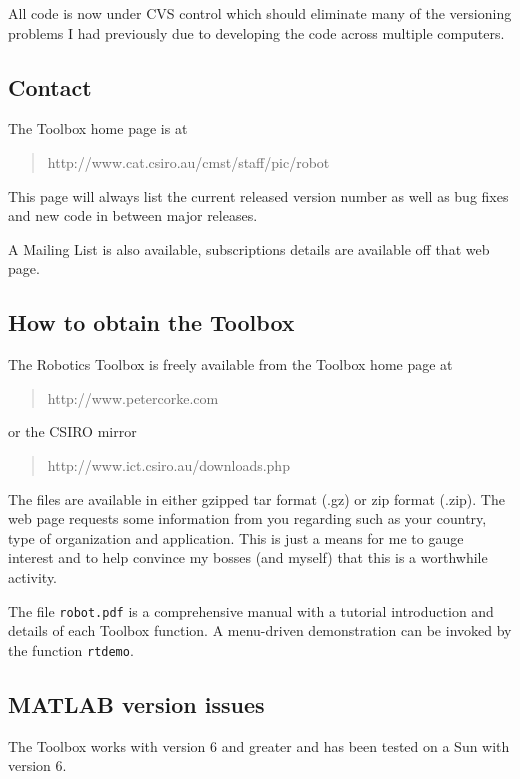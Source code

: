 \documentclass{article}
\begin{document}
All code is now under CVS control which should eliminate many of the
versioning problems I had previously due to developing the code across 
multiple computers.

\subsection{Contact}
The Toolbox home page is at
\begin{quote}
http://www.cat.csiro.au/cmst/staff/pic/robot
\end{quote}
This page will always list the current released version number as well as
bug fixes and new code in between major releases. 

A Mailing List is also available, subscriptions details are available
off that web page.

\subsection{How to obtain the Toolbox}
The Robotics Toolbox is freely available from the Toolbox home
page at 
\begin{quote}
http://www.petercorke.com
\end{quote}
or the CSIRO mirror
\begin{quote}
http://www.ict.csiro.au/downloads.php
\end{quote}

The files are available in either gzipped tar format (.gz) or zip
format (.zip).  The web page requests some information from you
regarding such as your country, type of organization and application.
This is just a means for me to gauge interest and to help convince my
bosses (and myself) that this is a worthwhile activity.

The file {\tt robot.pdf} is a comprehensive manual with a tutorial introduction
and details of each Toolbox function.
A menu-driven demonstration can be invoked by the function {\tt rtdemo}.

\subsection{MATLAB version issues}
The Toolbox works with {\Mlab} version 6 and greater and has been tested 
on a Sun with version 6.
\end{document}
